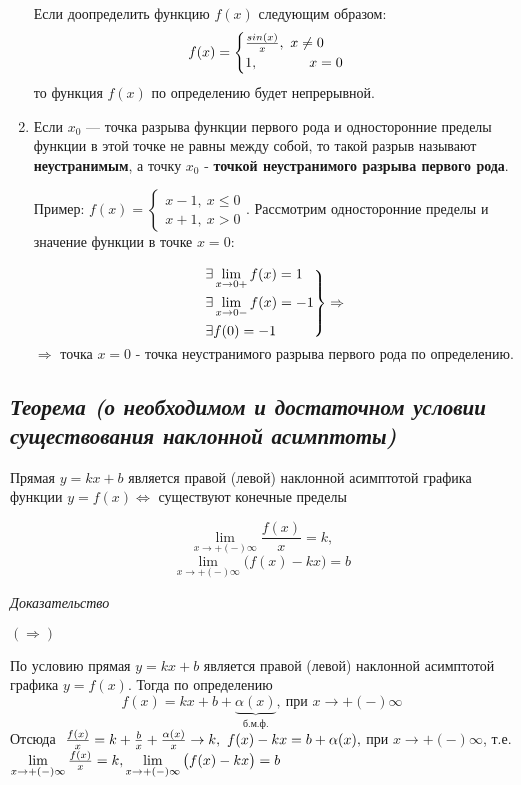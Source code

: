 \begin{enumerate}
Если доопределить функцию $f(x)$ следующим образом: $$f(x) = \begin{cases}
    {\Large\frac{sin(x)}{x}},\ x \neq 0\\
    1, \ \ \ \ \ \ \ \ \ \ \  x = 0
    \end{cases}$$ то функция $f(x)$ по определению будет непрерывной.
\item Если $x_0$ — точка разрыва функции первого рода и односторонние пределы функции в этой точке не равны между собой, то такой разрыв называют \textbf{неустранимым}, а точку $x_0$ - \textbf{точкой неустранимого разрыва первого рода}.

Пример: $f(x) = 
    \begin{cases}
    x - 1,\ x \leqslant 0\\
    x + 1, \  x > 0
    \end{cases}$. Рассмотрим односторонние пределы и значение функции в точке $x = 0$:

$$\begin{rcases}
    \exists\lim\limits_{x \rightarrow 0+}f(x) = 1\\
    \exists\lim\limits_{x \rightarrow 0-}f(x) = -1\\
    \exists f(0) = -1
    \end{rcases} \Rightarrow$$ $$\Rightarrow \text{ точка }x = 0 \text{ - точка неустранимого разрыва первого рода по определению.}$$

\end{enumerate}
\newpage 
\subsection{\textit{Теорема (о необходимом и достаточном условии существования наклонной асимптоты)}}

Прямая $y = kx + b$ является правой (левой) наклонной асимптотой графика функции $y = f(x) \iff$ существуют конечные пределы

$$\lim\limits_{x \to +(-)\infty}{\frac{f(x)}{x}} = k,$$ $$\lim\limits_{x \to +(-)\infty}{\big(f(x) - kx\big)} = b$$

\textit{Доказательство}

$(\Rightarrow)$

По условию прямая $y = kx + b$ является правой (левой) наклонной асимптотой графика $y = f(x)$. Тогда по определению
$$f(x) = kx+b+\underbrace{\alpha(x)}_{\text{б.м.ф.}},\ \text{при } x \rightarrow +(-)\infty$$ Отсюда $\ {\Large\frac{f(x)}{x}} = k + {\Large\frac{b}{x}} + {\Large\frac{\alpha(x)}{x}} \rightarrow k, \ f(x) - kx = b + \alpha(x), $ при $x \rightarrow +(-)\infty$, т.е. $\lim\limits_{x \to +(-)\infty}{\Large\frac{f(x)}{x}} = k,  \lim\limits_{x \to +(-)\infty}{\big(f(x) - kx\big)} = b$

